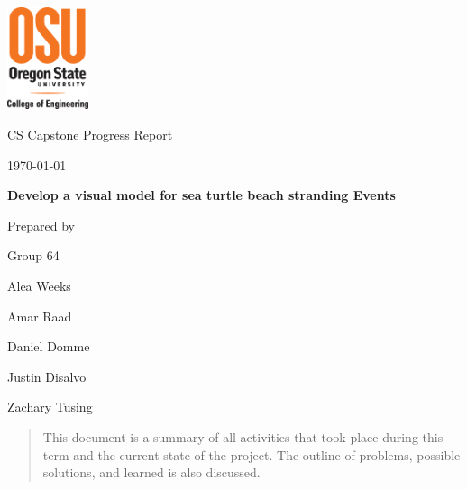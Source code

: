 \documentclass[onecolumn, draftclsnofoot,10pt, compsoc]{IEEEtran}
\def \CapstoneTeamName{		Beached Marine Critters Project Team}
\def \CapstoneTeamNumber{		64}
\def \GroupMemberOne{			Alea Weeks}
\def \GroupMemberTwo{			Amar Raad}
\def \GroupMemberThree{			Daniel Domme}
\def \GroupMemberFour{			Justin Disalvo}
\def \GroupMemberFive{			Zachary Tusing}
\def \CapstoneProjectName{		Develop a visual model for sea turtle beach stranding Events}
\def \CapstoneSponsorCompany{	Oregon State University Hatfield Marine Science Center; Oregon Sea Grant}
\def \CapstoneSponsorPerson{		Dr. William Hanshumaker}
\def \DocType{		%
				Progress Report
				}
\newcommand{\NameSigPair}[1]{\par
\makebox[2.75in][r]{#1} \hfil 	\makebox[3.25in]{\makebox[2.25in]{\hrulefill} \hfill		\makebox[.75in]{\hrulefill}}
\par\vspace{-12pt} \textit{\tiny\noindent
\makebox[2.75in]{} \hfil		\makebox[3.25in]{\makebox[2.25in][r]{Signature} \hfill	\makebox[.75in][r]{Date}}}}
\renewcommand{\NameSigPair}[1]{#1}
\begin{document}
\begin{titlepage}
    \begin{singlespace}
     \includegraphics[height=3cm]{coe_v_spot1}
        \hfill 
        \par\vspace{.2in}
        \centering
        \scshape{
            \huge CS Capstone \DocType \par
            {\normalsize\today}\par
            \vspace{.5in}
            \textbf{\Huge\CapstoneProjectName}\par
            \vspace{1in}
            {\large Prepared by }\par
            Group\CapstoneTeamNumber\par
            \vspace{5pt}
            {\Large
                \NameSigPair{\GroupMemberOne}\par
                \NameSigPair{\GroupMemberTwo}\par
                \NameSigPair{\GroupMemberThree}\par
				\NameSigPair{\GroupMemberFour}\par
			\NameSigPair{\GroupMemberFive}\par
            }
            \vspace{20pt}
        }
        \vfill
        \begin{abstract}
		    \noindent This document is a summary of all activities that took place during this term and the current state of the project. The outline of problems, possible solutions, and learned is also discussed. 
		    

\end{abstract}
\end{singlespace}
\end{titlepage}
\end{document}

